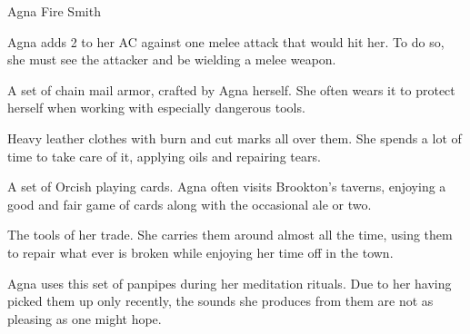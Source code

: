 \begin{DndMonster}{Agna Fire Smith}
\begin{multicols}{2}
        \DndMonsterMelee[
            name=Unarmed Strike,
            mod=+8,
            dmg=5,
            dmg-type=bludgeoning
        ]


        Agna adds 2 to her AC against one melee attack that would hit her.
        To do so, she must see the attacker and be wielding a melee weapon.


        A set of chain mail armor, crafted by Agna herself.
        She often wears it to protect herself when working with especially dangerous tools.

        Heavy leather clothes with burn and cut marks all over them.
        She spends a lot of time to take care of it, applying oils and repairing tears.

        A set of Orcish playing cards.
        Agna often visits Brookton's taverns, enjoying a good and fair game of cards along with the occasional ale or two.

        The tools of her trade.
        She carries them around almost all the time, using them to repair what ever is broken while enjoying her time off in the town.

        Agna uses this set of panpipes during her meditation rituals.
        Due to her having picked them up only recently, the sounds she produces from them are not as pleasing as one might hope.

    \end{multicols}
\end{DndMonster}